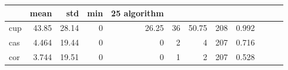 \begin{tabular}{lrrrrrrrr}
\toprule
 & mean & std & min & 25%
algorithm &  &  &  &  &  &  &  &  \\
\midrule
cup & 43.85 & 28.14 & 0 & 26.25 & 36 & 50.75 & 208 & 0.992 \\
cas & 4.464 & 19.44 & 0 & 0 & 2 & 4 & 207 & 0.716 \\
cor & 3.744 & 19.51 & 0 & 0 & 1 & 2 & 207 & 0.528 \\
\bottomrule
\end{tabular}
